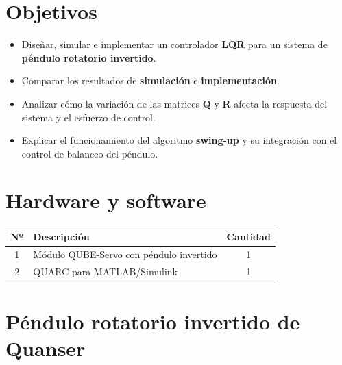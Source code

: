 \section{Objetivos}

\begin{itemize}
    \item Diseñar, simular e implementar un controlador \textbf{LQR} para un sistema de \textbf{péndulo rotatorio invertido}.
    \item Comparar los resultados de \textbf{simulación} e \textbf{implementación}.
    \item Analizar cómo la variación de las matrices \textbf{Q} y \textbf{R} afecta la respuesta del sistema y el esfuerzo de control.
    \item Explicar el funcionamiento del algoritmo \textbf{swing-up} y su integración con el control de balanceo del péndulo.
\end{itemize}

\section{Hardware y software}
\begin{center}
\renewcommand{\arraystretch}{1.2}
\begin{tabular}{|c|p{}|c|}
\hline
\textbf{Nº} & \textbf{Descripción} & \textbf{Cantidad} \\\hline
1 & Módulo QUBE-Servo con péndulo invertido & 1 \\\hline
2 & QUARC para MATLAB/Simulink & 1 \\\hline
\end{tabular}
\end{center}

\section{Péndulo rotatorio invertido de Quanser}

